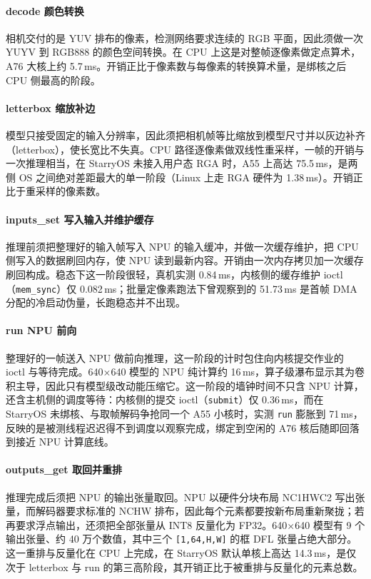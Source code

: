 \paragraph{decode 颜色转换}
相机交付的是 YUV 排布的像素，检测网络要求连续的 RGB 平面，因此须做一次 YUYV 到 RGB888 的颜色空间转换。在 CPU 上这是对整帧逐像素做定点算术，A76 大核上约 5.7\,ms。开销正比于像素数与每像素的转换算术量，是绑核之后 CPU 侧最高的阶段。

\paragraph{letterbox 缩放补边}
模型只接受固定的输入分辨率，因此须把相机帧等比缩放到模型尺寸并以灰边补齐（letterbox），使长宽比不失真。CPU 路径逐像素做双线性重采样，一帧的开销与一次推理相当，在 StarryOS 未接入用户态 RGA 时，A55 上高达 75.5\,ms，是两侧 OS 之间绝对差距最大的单一阶段（Linux 上走 RGA 硬件为 1.38\,ms）。开销正比于重采样的像素数。

\paragraph{inputs\_set 写入输入并维护缓存}
推理前须把整理好的输入帧写入 NPU 的输入缓冲，并做一次缓存维护，把 CPU 侧写入的数据刷回内存，使 NPU 读到最新内容。开销由一次内存拷贝加一次缓存刷回构成。稳态下这一阶段很轻，真机实测 0.84\,ms，内核侧的缓存维护 ioctl（\texttt{mem\_sync}）仅 0.082\,ms；批量定像素跑法下曾观察到的 51.73\,ms 是首帧 DMA 分配的冷启动伪量，长跑稳态并不出现。

\paragraph{run NPU 前向}
整理好的一帧送入 NPU 做前向推理，这一阶段的计时包住向内核提交作业的 ioctl 与等待完成。640×640 模型的 NPU 纯计算约 16\,ms，算子级瀑布显示其为卷积主导，因此只有模型级改动能压缩它。这一阶段的墙钟时间不只含 NPU 计算，还含主机侧的调度等待：内核侧的提交 ioctl（\texttt{submit}）仅 0.36\,ms，而在 StarryOS 未绑核、与取帧解码争抢同一个 A55 小核时，实测 \texttt{run} 膨胀到 71\,ms，反映的是被测线程迟迟得不到调度以观察完成，绑定到空闲的 A76 核后随即回落到接近 NPU 计算底线。

\paragraph{outputs\_get 取回并重排}
推理完成后须把 NPU 的输出张量取回。NPU 以硬件分块布局 NC1HWC2 写出张量，而解码器要求标准的 NCHW 排布，因此每个元素都要按新布局重新聚拢；若再要求浮点输出，还须把全部张量从 INT8 反量化为 FP32。640×640 模型有 9 个输出张量、约 40 万个数值，其中三个 \texttt{[1,64,H,W]} 的框 DFL 张量占绝大部分。这一重排与反量化在 CPU 上完成，在 StarryOS 默认单核上高达 14.3\,ms，是仅次于 letterbox 与 run 的第三高阶段，其开销正比于被重排与反量化的元素总数。

